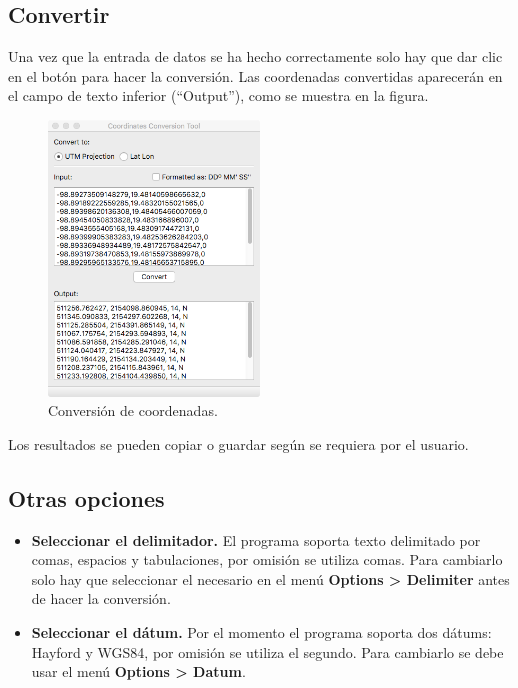 \documentclass[12pt, letterpaper]{article}
\begin{document}
\subsection{Convertir}

Una vez que la entrada de datos se ha hecho correctamente solo hay que dar clic en el botón para hacer la conversión. Las coordenadas convertidas aparecerán en el campo de texto inferior (``Output''), como se muestra en la figura.

\begin{figure}[h]
    \centering
    \includegraphics[width=0.5\textwidth]{img/conversion.png}
    \caption{Conversión de coordenadas.}
    \label{fig:conversion}
\end{figure}

Los resultados se pueden copiar o guardar según se requiera por el usuario.

\subsection{Otras opciones}

\begin{itemize}
\item \textbf{Seleccionar el delimitador.} El programa soporta texto delimitado por comas, espacios y tabulaciones, por omisión se utiliza comas. Para cambiarlo solo hay que seleccionar el necesario en el menú \textbf{Options > Delimiter} antes de hacer la conversión.
\item \textbf{Seleccionar el dátum.} Por el momento el programa soporta dos dátums: Hayford y WGS84, por omisión se utiliza el segundo. Para cambiarlo se debe usar el menú \textbf{Options > Datum}.

\end{itemize}
\end{document}
